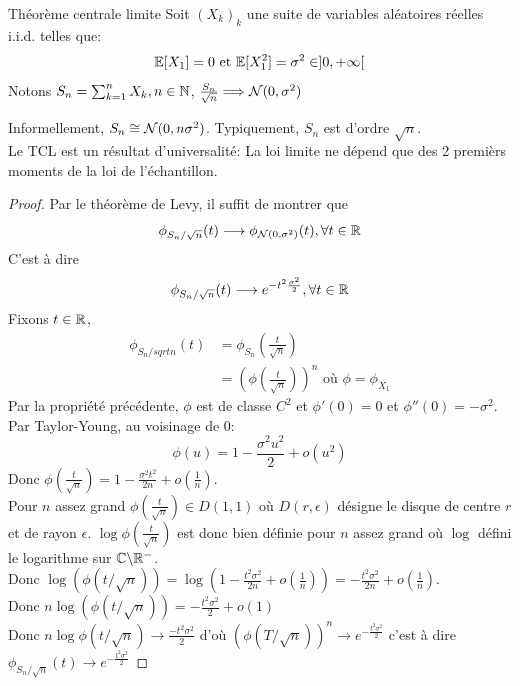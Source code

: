 \documentclass[]{report}
\begin{document}
    \begin{tm}{Théorème centrale limite}{}
        Soit $(X_k)_k$ une suite de variables aléatoires réelles i.i.d. telles que:
        \[\mathbb{E}[X_1]=0\text{ et }\mathbb{E}[X_1^2]=\sigma^2\in ]0,+\infty[\]
        Notons $S_n=\sum_{k=1}^{n}X_k,n\in \mathbb{N}$, $\frac{S_n}{\sqrt{n}}\Longrightarrow \mathcal{N}(0,\sigma^2)$
    \end{tm}

    \begin{re}{}{}
        Informellement, $S_n\cong \mathcal{N}(0,n\sigma^2)$. Typiquement, $S_n$ est d'ordre $\sqrt{n}$.\\
        Le TCL est un résultat d'universalité: La loi limite ne dépend que des 2 premièrs moments de la loi de l'échantillon.
    \end{re}

    \begin{proof}
        Par le théorème de Levy, il suffit de montrer que
        \[\phi_{S_n/\sqrt{n}}(t)\longrightarrow \phi_{\mathcal{N}(0,\sigma^2)}(t),\forall t\in \mathbb{R}\]
        C'est à dire
        \[\phi_{S_n/\sqrt{n}}(t)\longrightarrow e^{-t^2\frac{\sigma^2}{2}},\forall t\in \mathbb{R}\]
        Fixons $t\in \mathbb{R}$,
        \begin{align*}
            \phi_{S_n/sqrt{n}}(t)&=\phi_{S_n}\left(\frac{t}{\sqrt{n}}\right)\\
            &=\left(\phi\left(\frac{t}{\sqrt{n}}\right)\right)^n\text{ où $\phi=\phi_{X_1}$}
        \end{align*}
        Par la propriété précédente, $\phi$ est de classe $C^2$ et $\phi'(0)=0$ et $\phi''(0)=-\sigma^2$. Par Taylor-Young, au voisinage de $0$:
        \[\phi(u)=1-\frac{\sigma^2 u^2}{2}+o(u^2)\]
        Donc $\phi(\frac{t}{\sqrt{n}})=1-\frac{\sigma^2 t^2}{2n}+o\left(\frac{1}{n}\right)$.\\
        Pour $n$ assez grand $\phi\left(\frac{t}{\sqrt{n}}\right)\in D(1,1)$ où $D(r,\epsilon)$ désigne le disque de centre $r$ et de rayon $\epsilon$. $\log \phi\left(\frac{t}{\sqrt{n}}\right)$ est donc bien définie pour $n$ assez grand où $\log$ défini le logarithme sur $\mathbb{C}\backslash \mathbb{R}^-$.\\
        Donc $\log (\phi(t/\sqrt{n}))=\log (1-\frac{t^2\sigma^2}{2n}+o(\frac{1}{n}))=-\frac{t^2\sigma^2}{2n}+o(\frac{1}{n})$.\\
        Donc $n\log(\phi(t/\sqrt{n}))=-\frac{t^2\sigma^2}{2}+o(1)$\\
        Donc $n\log \phi(t/\sqrt{n})\longrightarrow \frac{-t^2 \sigma^2}{2}$ d'où $(\phi (T/\sqrt{n}))^n\longrightarrow e^{-\frac{t^2\sigma^2}{2}}$ c'est à dire $\phi_{S_n/\sqrt{n}}(t)\longrightarrow e^{-\frac{t^2\sigma^2}{2}}$
    \end{proof}
\end{document}
